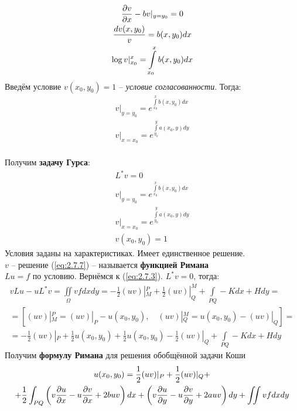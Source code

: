 \documentclass[../main.tex]{subfiles}
\begin{document}
\begin{gather*}
    \frac{\partial v}{\partial x}-bv|_{y=y_0} = 0\\
    \frac{dv(x,y_0)}{v} = b(x,y_0)dx\\
    \log v|_{x_0}^x = \int\limits_{x_0}^x b(x,y_0)dx\\
\end{gather*}
Введём условие $v(x_0,y_0)=1$ -- \textit{условие согласованности}. Тогда:
\begin{gather}
    \label{eq:2.7.5}
    v|_{y=y_0} = e^{\int\limits_{x_0}^x b(x,y_0)dx}\\
    \label{eq:2.7.6}
    v|_{x=x_0} = e^{\int\limits_{y_0}^y a(x_0,y)dy}
\end{gather}
\\
Получим \textbf{задачу Гурса}:
\begin{equation}
    \begin{gathered}
        \label{eq:2.7.7}
        L^*v=0\\
        v|_{y=y_0} = e^{\int\limits_{x_0}^x b(x,y_0)dx}\\
        v|_{x=x_0} = e^{\int\limits_{y_0}^y a(x_0,y)dy}\\
        v(x_0,y_0)=1
    \end{gathered}
\end{equation}
Условия заданы на характеристиках. Имеет единственное решение.
\\
$v$ -- решение (\ref{eq:2.7.7}) -- называется \textbf{функцией Римана}
\\
$Lu=f$ по условию. Вернёмся к (\ref{eq:2.7.3}). $L^*v=0$, тогда:
\begin{gather*}
    vLu - uL^*v = \iint\limits_{\Omega} vfdxdy =
    -\frac{1}{2}(uv)|_M^P + \frac{1}{2}(uv)|_Q^M + \int\limits_{PQ}-Kdx + Hdy =\\=
    \left[(uv)|_M^P = (uv)|_P - u(x_0, y_0), \quad (uv)|_Q^M = u(x_0, y_0) - (uv)|_Q\right] =\\=
    -\frac{1}{2}(uv)|_P +\frac{1}{2} u(x_0, y_0) + \frac{1}{2} u(x_0, y_0) - \frac{1}{2}(uv)|_Q +
    \int\limits_{PQ}-Kdx+Hdy
\end{gather*}
Получим \textbf{формулу Римана} для решения обобщённой задачи Коши
\begin{equation}
    \begin{gathered}
        \label{eq:2.7.8}
        u(x_0,y_0) = \frac{1}{2}(uv)|_P + \frac{1}{2}(uv)|_Q+\\+
        \frac{1}{2}\int_{PQ}\left(v\frac{\partial u}{\partial x} - u\frac{\partial v}{\partial x} + 2buv\right)dx +
        \left(v\frac{\partial u}{\partial y} - u\frac{\partial v}{\partial y} + 2auv\right)dy +
        \iint\limits vfdxdy
    \end{gathered}
\end{equation}
\end{document}
